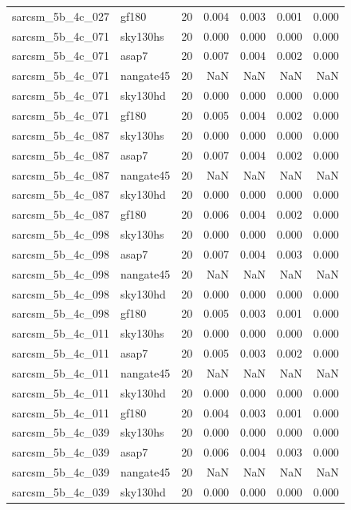 \begin{tabular}{llrrrrr}
sarcsm\_5b\_4c\_027 & gf180 & 20 & 0.004 & 0.003 & 0.001 & 0.000 \\
sarcsm\_5b\_4c\_071 & sky130hs & 20 & 0.000 & 0.000 & 0.000 & 0.000 \\
sarcsm\_5b\_4c\_071 & asap7 & 20 & 0.007 & 0.004 & 0.002 & 0.000 \\
sarcsm\_5b\_4c\_071 & nangate45 & 20 & NaN & NaN & NaN & NaN \\
sarcsm\_5b\_4c\_071 & sky130hd & 20 & 0.000 & 0.000 & 0.000 & 0.000 \\
sarcsm\_5b\_4c\_071 & gf180 & 20 & 0.005 & 0.004 & 0.002 & 0.000 \\
sarcsm\_5b\_4c\_087 & sky130hs & 20 & 0.000 & 0.000 & 0.000 & 0.000 \\
sarcsm\_5b\_4c\_087 & asap7 & 20 & 0.007 & 0.004 & 0.002 & 0.000 \\
sarcsm\_5b\_4c\_087 & nangate45 & 20 & NaN & NaN & NaN & NaN \\
sarcsm\_5b\_4c\_087 & sky130hd & 20 & 0.000 & 0.000 & 0.000 & 0.000 \\
sarcsm\_5b\_4c\_087 & gf180 & 20 & 0.006 & 0.004 & 0.002 & 0.000 \\
sarcsm\_5b\_4c\_098 & sky130hs & 20 & 0.000 & 0.000 & 0.000 & 0.000 \\
sarcsm\_5b\_4c\_098 & asap7 & 20 & 0.007 & 0.004 & 0.003 & 0.000 \\
sarcsm\_5b\_4c\_098 & nangate45 & 20 & NaN & NaN & NaN & NaN \\
sarcsm\_5b\_4c\_098 & sky130hd & 20 & 0.000 & 0.000 & 0.000 & 0.000 \\
sarcsm\_5b\_4c\_098 & gf180 & 20 & 0.005 & 0.003 & 0.001 & 0.000 \\
sarcsm\_5b\_4c\_011 & sky130hs & 20 & 0.000 & 0.000 & 0.000 & 0.000 \\
sarcsm\_5b\_4c\_011 & asap7 & 20 & 0.005 & 0.003 & 0.002 & 0.000 \\
sarcsm\_5b\_4c\_011 & nangate45 & 20 & NaN & NaN & NaN & NaN \\
sarcsm\_5b\_4c\_011 & sky130hd & 20 & 0.000 & 0.000 & 0.000 & 0.000 \\
sarcsm\_5b\_4c\_011 & gf180 & 20 & 0.004 & 0.003 & 0.001 & 0.000 \\
sarcsm\_5b\_4c\_039 & sky130hs & 20 & 0.000 & 0.000 & 0.000 & 0.000 \\
sarcsm\_5b\_4c\_039 & asap7 & 20 & 0.006 & 0.004 & 0.003 & 0.000 \\
sarcsm\_5b\_4c\_039 & nangate45 & 20 & NaN & NaN & NaN & NaN \\
sarcsm\_5b\_4c\_039 & sky130hd & 20 & 0.000 & 0.000 & 0.000 & 0.000 \\

\end{tabular}
